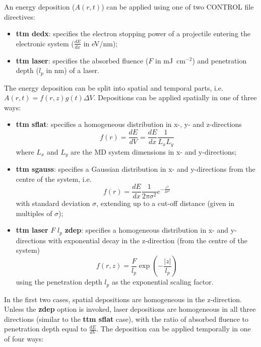 An energy deposition
($A(r,t)$) can be applied using one of two CONTROL file directives:
\begin{itemize}
\item {\bf ttm dedx}: specifies the electron stopping power of a projectile entering the electronic system ($\frac{dE}{dx}$ in eV/nm);
\item {\bf ttm laser}: specifies the absorbed fluence ($F$ in mJ~cm$^{-2}$) and penetration depth ($l_p$ in nm) of a laser.
\end{itemize}
The energy deposition can be split into spatial and temporal parts, i.e.
$A(r,t) = f(r,z) g(t) \Delta V$. Depositions can be applied spatially in one of three ways:
\begin{itemize}
\item {\bf ttm sflat}: specifies a homogeneous distribution in x-, y- and z-directions \begin{equation*}f(r) = \frac{dE}{dV} = \frac{dE}{dx} \frac{1}{L_{x} L_{y}}\end{equation*} where $L_{x}$ and $L_{y}$ are the MD system dimensions in x- and y-directions;
\item {\bf ttm sgauss}: specifies a Gaussian distribution in x- and y-directions from the centre of the system, i.e.\begin{equation*}f(r) = \frac{dE}{dx} \frac{1}{2 \pi \sigma^2} e^{-\frac{r^2}{2\sigma^2}}\end{equation*} with standard deviation $\sigma$, extending up to a cut-off distance (given in multiples of $\sigma$);
\item {\bf ttm laser} $F$ $l_p$ {\bf zdep}: specifies a homogeneous distribution in x- and y-directions with exponential decay in the z-direction (from the centre of the system) \begin{equation*}f(r,z) = \frac{F}{l_p} \exp\left(-\frac{|z|}{l_p}\right) \end{equation*} using the penetration depth $l_p$ as the exponential scaling factor.
\end{itemize}
In the first two cases, spatial depositions are homogeneous in the z-direction.
Unless the {\bf zdep} option is invoked, laser depositions are homogeneous
in all three directions (similar to the {\bf ttm sflat} case), with the ratio of
absorbed fluence to penetration depth equal to $\frac{dE}{dV}$.
The deposition can be applied temporally in one of four ways:
